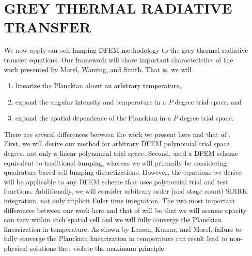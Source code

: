 %
%
%



\chapter{\uppercase{Grey Thermal Radiative Transfer}}
\label{sec:chapter6_grey_radtran}

We now apply our self-lumping DFEM methodology to the grey thermal radiative transfer equations.
Our framework will share important characteristics of the work presented by Morel, Wareing, and Smith\cite{morel_radtran}.
That is, we will
\begin{enumerate}
\item linearize the Planckian about an arbitrary temperature,
\item  expand the angular intensity and temperature in a $P$ degree trial space, and
\item expand the spatial dependence of the Planckian in a $P$ degree trial space.
\end{enumerate}
There are several differences between the work we present here and that of \cite{morel_radtran}.
First, we will derive our method for arbitrary DFEM polynomial trial space degree, not only a linear polynomial trial space.
Second, \cite{morel_radtran} used a DFEM scheme equivalent to traditional lumping, whereas we will primarily be considering quadrature based self-lumping discretizations.
However, the equations we derive will be applicable to any DFEM scheme that uses polynomial trial and test functions.
Additionally, we will consider arbitrary order (and stage count) SDIRK integration, not only implicit Euler time integration.
The two most important differences between our work here and that of \cite{morel_radtran} will be that we will assume opacity can vary within each spatial cell and we will fully converge the Planckian linearization in temperature.
As shown by Larsen, Kumar, and Morel, failure to fully converge the Planckian linearization in temperature can result lead to non-physical solutions that violate the maximum principle\cite{larsen_trt}.

